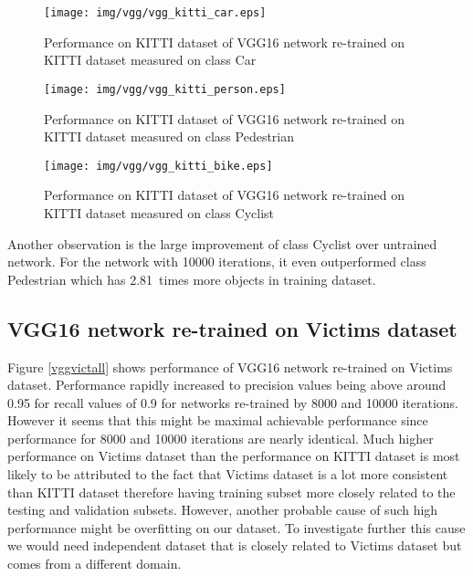 \begin{figure}[!]
\texttt{[image: img/vgg/vgg\_kitti\_car.eps]}
\caption[Performance of VGG16 network on KITTI dataset, class Car]{Performance on KITTI dataset of VGG16 network re-trained on KITTI dataset measured on class Car}
\label{vggkittic}
\end{figure}

\begin{figure}[!]
\texttt{[image: img/vgg/vgg\_kitti\_person.eps]}
\caption[Performance of VGG16 network on KITTI dataset, class Pedestrian]{Performance on KITTI dataset of VGG16 network re-trained on KITTI dataset measured on class Pedestrian}
\label{vggkittip}
\end{figure}

\begin{figure}[!]
\texttt{[image: img/vgg/vgg\_kitti\_bike.eps]}
\caption[Performance of VGG16 network on KITTI dataset, class Cyclist]{Performance on KITTI dataset of VGG16 network re-trained on KITTI dataset measured on class Cyclist}
\label{vggkittib}
\end{figure}

Another observation is the large improvement of class Cyclist over untrained network. For the network with 10000 iterations, it even outperformed class Pedestrian which has 2.81~times more objects in training dataset.

\subsection{VGG16 network re-trained on Victims dataset}

Figure \ref{vggvictall} shows performance of VGG16 network re-trained on Victims dataset. Performance rapidly increased to precision values being above around 0.95 for recall values of 0.9 for networks re-trained by 8000 and 10000 iterations. However it seems that this might be maximal achievable performance since performance for 8000 and 10000 iterations are nearly identical. Much higher performance on Victims dataset than the performance on KITTI dataset is most likely to be attributed to the fact that Victims dataset is a lot more consistent than KITTI dataset therefore having training subset more closely related to the testing and validation subsets. However, another probable cause of such high performance might be overfitting on our dataset. To investigate further this cause we would need independent dataset that is closely related to Victims dataset but comes from a different domain.

